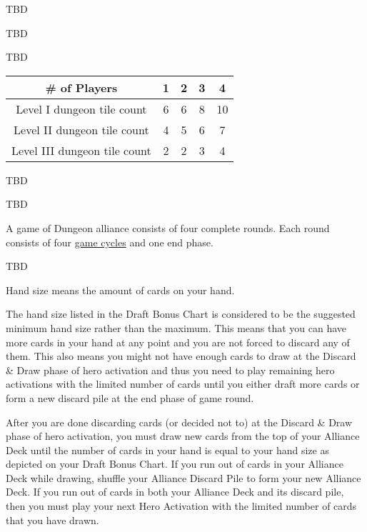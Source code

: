 TBD

TBD

TBD

\begin{table}
\centering
\begin{tabular}{ccccc}
\toprule
\# of Players & 1 & 2 & 3 & 4 \\
\midrule
Level I dungeon tile count & 6 & 6 & 8 & 10 \\
Level II dungeon tile count & 4 & 5 & 6 & 7 \\
Level III dungeon tile count & 2 & 2 & 3 & 4 \\
\bottomrule
\end{tabular}
\end{table}

TBD





TBD

A game of Dungeon alliance consists of four complete rounds. Each round consists of four \hyperref[sec:Gamecycle]{game cycles} and one end phase.


TBD


Hand size means the amount of cards on your hand. 

The hand size listed in the Draft Bonus Chart is considered to be the suggested minimum hand size rather than the maximum. This means that you can have more cards in your hand at any point and you are not forced to discard any of them. This also means you might not have enough cards to draw at the Discard \& Draw phase of hero activation and thus you need to play remaining hero activations with the limited number of cards until you either draft more cards or form a new discard pile at the end phase of game round.

After you are done discarding cards (or decided not to) at the Discard \& Draw phase of hero activation, you must draw new cards from the top of your Alliance Deck until the number of cards in your hand is equal to your hand size as depicted on your Draft Bonus Chart. If you run out of cards in your Alliance Deck while drawing, shuffle your Alliance Discard Pile to form your new Alliance Deck. If you run out of cards in both your Alliance Deck and its discard pile, then you must play your next Hero Activation with the limited number of cards that you have drawn.

